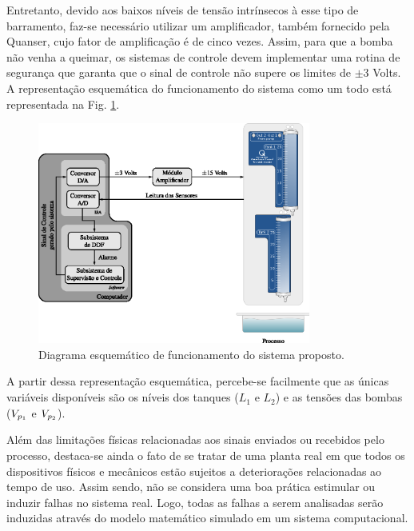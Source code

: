 
Entretanto, devido aos baixos níveis de tensão intrínsecos à esse tipo de
barramento, faz-se necessário utilizar um amplificador, também fornecido pela
Quanser\reg, cujo fator de amplificação é de cinco vezes. Assim, para que a
bomba não venha a queimar, os sistemas de controle devem implementar uma rotina
de segurança que garanta que o sinal de controle não supere os limites de $\pm
3$ Volts. A representação esquemática do funcionamento do sistema como um todo
está representada na Fig. \ref{fig:func_sistema}.

\begin{figure}[htb]
\centering
    \includegraphics[width=0.8\textwidth]{imgs/sistema/eps/func_sistema}
    \caption{Diagrama esquemático de funcionamento do sistema proposto.}
    \label{fig:func_sistema}
\end{figure}

A partir dessa representação esquemática, percebe-se facilmente que as únicas
variáveis disponíveis são os níveis dos tanques ($L_1$ e $L_2$) e as tensões das
bombas ($V_{p_{\tiny 1}}$ e $V_{p_{\tiny 2}}$).

Além das limitações físicas relacionadas aos sinais enviados ou recebidos pelo
processo, destaca-se ainda o fato de se tratar de uma planta real em que todos
os dispositivos físicos e mecânicos estão sujeitos a deteriorações relacionadas
ao tempo de uso. Assim sendo, não se considera uma boa prática estimular ou
induzir falhas no sistema real. Logo, todas as falhas a serem analisadas serão
induzidas através do modelo matemático simulado em um sistema computacional.

